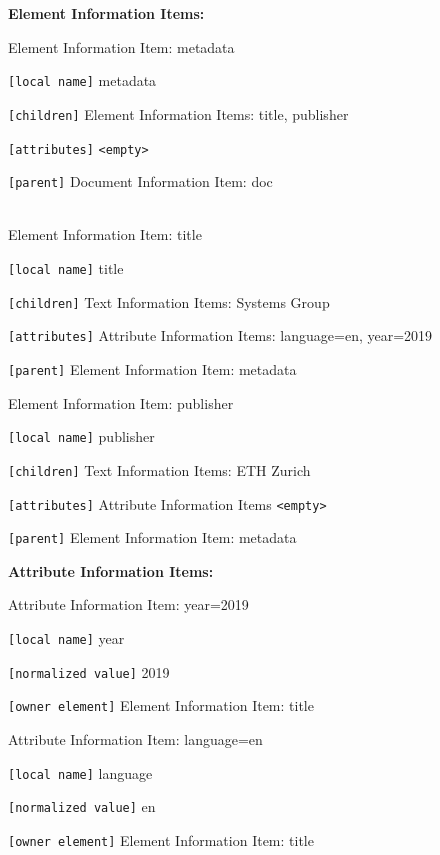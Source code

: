 \documentclass[11pt,oneside,a4paper]{article}
\begin{document}
\textbf{Element Information Items:}
\vspace{-\topsep}
\begin{multicols}{2}
	\begin{compactitem}
		\item Element Information Item: metadata
		\item \verb|[local name]| metadata
		\item \verb|[children]| Element Information Items: title, publisher
		\item \verb|[attributes]| \verb|<empty>|
		\item \verb|[parent]| Document Information Item: doc\\\\
	\end{compactitem}
	
	\begin{compactitem}
		\item Element Information Item: title
		\item \verb|[local name]| title
		\item \verb|[children]| Text Information Items: Systems Group
		\item \verb|[attributes]| Attribute Information Items: language=en, year=2019
		\item \verb|[parent]| Element Information Item: metadata\\
	\end{compactitem}
\end{multicols}

	\begin{compactitem}
	\item Element Information Item: publisher
	\item \verb|[local name]| publisher
	\item \verb|[children]| Text Information Items: ETH Zurich
	\item \verb|[attributes]| Attribute Information Items \verb|<empty>|
	\item \verb|[parent]| Element Information Item: metadata
\end{compactitem}

\textbf{Attribute Information Items:}
\vspace{-\topsep}
\begin{multicols}{2}
	\begin{compactitem}
		\item Attribute Information Item: year=2019
		\item \verb|[local name]| year
		\item \verb|[normalized value]| 2019
		\item \verb|[owner element]| Element Information Item: title
		
		\item Attribute Information Item: language=en
		\item \verb|[local name]| language
		\item \verb|[normalized value]| en
		\item \verb|[owner element]| Element Information Item: title
	\end{compactitem}
\end{multicols}
\vspace{-\topsep}
\end{document}
